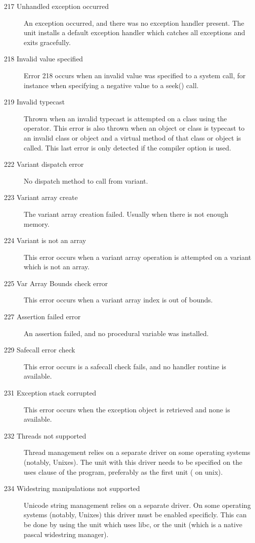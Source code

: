 \begin{description}
\item [217 Unhandled exception occurred]
An exception occurred, and there was no exception handler present.
The  unit installs a default exception handler which catches
all exceptions and exits gracefully.

\item[218 Invalid value specified]
Error 218 occurs when an invalid value was specified to a system call,
for instance when specifying a negative value to a seek() call.

\item [219 Invalid typecast]

Thrown when an invalid typecast is attempted on a class using the 
operator. This error is also thrown when an object or class is
typecast to an invalid class or object and a virtual method of
that class or object is called. This last error is only detected
if the  compiler option is used.


\item[222 Variant dispatch error]
No dispatch method to call from variant.

\item[223 Variant array create]
The variant array creation failed. Usually when there is not enough memory.

\item[224 Variant is not an array]
This error occurs when a variant array operation is attempted on a variant
which is not an array.

\item[225 Var Array Bounds check error]
This error occurs when a variant array index is out of bounds.

\item [227 Assertion failed error]
An assertion failed, and no  procedural variable was
installed.

\item [229 Safecall error check]
This error occurs is a safecall check fails, and no handler routine is
available.

\item [231 Exception stack corrupted]
This error occurs when the exception object is retrieved and none is
available.

\item [232 Threads not supported]
Thread management relies on a separate driver on some operating systems
(notably, Unixes). The unit with this driver needs to be specified on
the uses clause of the program, preferably as the first unit
( on unix).

\item [234 Widestring manipulations not supported]
Unicode string management relies on a separate driver. On some operating systems
(notably, Unixes) this driver must be enabled specificly. This can be done
by using the  unit which uses libc, or the  unit
(which is a native pascal widestring manager). 

\end{description}

